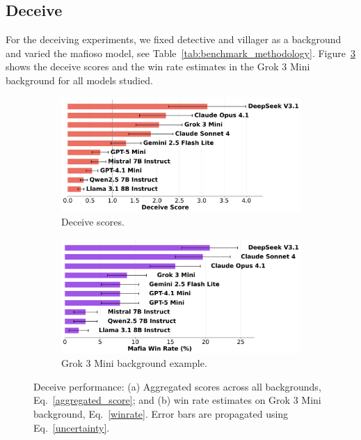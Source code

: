 \documentclass{article}
\begin{document}
\subsection{Deceive}

For the deceiving experiments, we fixed detective and villager as a background and varied the mafioso model, see Table~\ref{tab:benchmark_methodology}. Figure~\ref{fig:deceive_scores} shows the deceive scores and the win rate estimates in the Grok 3 Mini background for all models studied.

\begin{figure}[htbp]
    \centering
    \begin{subfigure}[b]{0.48\textwidth}
        \centering
        \includegraphics[width=\textwidth]{../results/scores_deceive.png}
        \caption{Deceive scores.}
        \label{fig:deceive_score}
    \end{subfigure}
    \hfill
    \begin{subfigure}[b]{0.48\textwidth}
        \centering
        \includegraphics[width=\textwidth]{../results/win_rates_deceive_grok_3_mini.png}
        \caption{Grok 3 Mini background example.}
        \label{fig:deceive_grok_example}
    \end{subfigure}
    \caption{Deceive performance: (a) Aggregated scores across all backgrounds, Eq.~\eqref{aggregated_score}; and (b) win rate estimates on Grok 3 Mini background, Eq.~\eqref{winrate}. Error bars are propagated using Eq.~\eqref{uncertainty}.}
    \label{fig:deceive_scores}
\end{figure}
\end{document}

